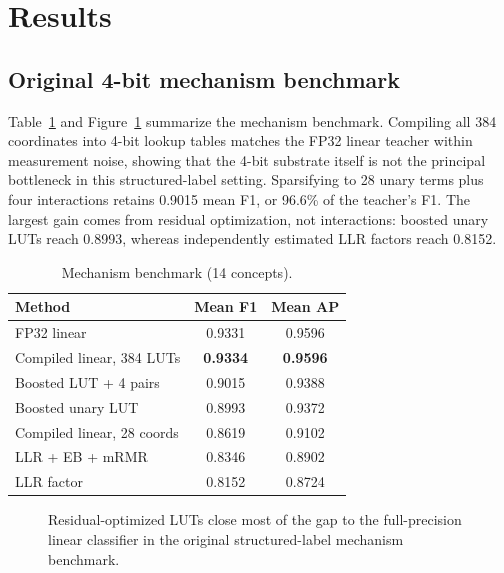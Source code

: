 
\section{Results}
\subsection{Original 4-bit mechanism benchmark}
Table~\ref{tab:mechanism} and Figure~\ref{fig:mechanism} summarize the mechanism benchmark. Compiling all 384 coordinates into 4-bit lookup tables matches the FP32 linear teacher within measurement noise, showing that the 4-bit substrate itself is not the principal bottleneck in this structured-label setting. Sparsifying to 28 unary terms plus four interactions retains 0.9015 mean F1, or 96.6\% of the teacher's F1. The largest gain comes from residual optimization, not interactions: boosted unary LUTs reach 0.8993, whereas independently estimated LLR factors reach 0.8152.

\begin{table}[t]
\centering
\caption{Mechanism benchmark (14 concepts).}
\label{tab:mechanism}
\small
\begin{tabular}{lcc}
\toprule
Method & Mean F1 & Mean AP\\
\midrule
FP32 linear & 0.9331 & 0.9596\\
Compiled linear, 384 LUTs & \textbf{0.9334} & \textbf{0.9596}\\
Boosted LUT + 4 pairs & 0.9015 & 0.9388\\
Boosted unary LUT & 0.8993 & 0.9372\\
Compiled linear, 28 coords & 0.8619 & 0.9102\\
LLR + EB + mRMR & 0.8346 & 0.8902\\
LLR factor & 0.8152 & 0.8724\\
\bottomrule
\end{tabular}
\end{table}

\begin{figure}[t]
\centering
{}
\caption{Residual-optimized LUTs close most of the gap to the full-precision linear classifier in the original structured-label mechanism benchmark.}
\label{fig:mechanism}
\end{figure}

